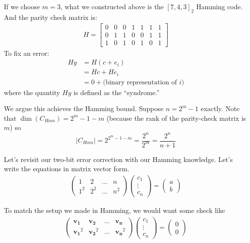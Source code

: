 If we choose $m = 3$, what we constructed above is the $[7, 4, 3]_2$ Hamming code. And the parity check matrix is:
\begin{align*}
    H = \begin{bmatrix}
        0 & 0 & 0 & 1 & 1 & 1 & 1 \\ 0 & 1 & 1 & 0 & 0 & 1 & 1 \\ 1 & 0 & 1 & 0 & 1 & 0 & 1
    \end{bmatrix}
\end{align*}
To fix an error:
\begin{align*}
    Hy &= H(c + e_i) \\
    &= Hc + He_i \\
    &= 0 + \text{(binary representation of $i$)}
\end{align*}
where the quantity $Hy$ is defined as the ``syndrome.''

We argue this achieves the Hamming bound. Suppose $n = 2^m - 1$ exactly. Note that $\dim(C_{Ham}) = 2^m - 1 - m$ (because the rank of the parity-check matrix is $m$) so 
\[ |C_{Ham}| = 2^{2^m - 1 - m} = \frac{2^n}{2^m} = \frac{2^n}{n + 1} \]

Let's revisit our two-bit error correction with our Hamming knowledge. Let's write the equations in matrix vector form.
\begin{align*}
    \begin{pmatrix}
        1 & 2 & \dots & n \\
        1^2 & 2^2 & \dots & n^2
    \end{pmatrix} \begin{pmatrix}
        c_1 \\ \vdots \\ c_n
    \end{pmatrix} = \begin{pmatrix}
        a \\ b
    \end{pmatrix}
\end{align*}

To match the setup we made in Hamming, we would want some check like
\begin{align*}
    \begin{pmatrix}
        \mathbf{v_1} & \mathbf{v_2} & \dots & \mathbf{v_n} \\
        \mathbf{v_1}^2 & \mathbf{v_2}^2 & \dots & \mathbf{v_n}^2
    \end{pmatrix} \begin{pmatrix}
        c_1 \\ \vdots \\ c_n
    \end{pmatrix} = \begin{pmatrix}
        0 \\ 0
    \end{pmatrix}
\end{align*}

